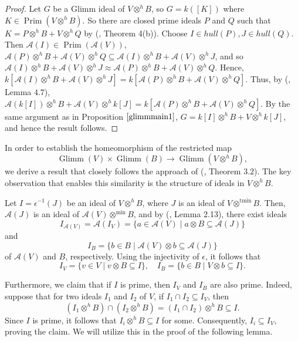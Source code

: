 \documentclass{birkjour}
\theoremstyle{definition}
\theoremstyle{remark}
\numberwithin{equation}{section}
\begin{document}
\begin{proof}
    Let $G$ be a Glimm ideal of $V \otimes^h B$, so $G= k([K])$ where $K\in \operatorname{Prim}(V\otimes^h B)$.  So there are closed prime ideals $P$ and $Q$ such that $K=P \otimes^h B+ V \otimes^h Q$ by (\cite{AA}, Theorem 4(b)). Choose $I\in hull(P), J\in hull(Q) $. Then 
    $ \mathcal{A}(I)\in \operatorname{Prim}( \mathcal{A}(V))$, $ \mathcal{A}(P) \otimes^h B+  \mathcal{A}(V) \otimes^h Q \subseteq  \mathcal{A}(I) \otimes^h B+  \mathcal{A}(V) \otimes^h J$, and so  $ \mathcal{A}(I) \otimes^h B+  \mathcal{A}(V) \otimes^h J \approx  \mathcal{A}(P) \otimes^h B+  \mathcal{A}(V) \otimes^h Q$. Hence, $ k[\mathcal{A}(I) \otimes^h B+  \mathcal{A}(V) \otimes^h J] = k[ \mathcal{A}(P) \otimes^h B+  \mathcal{A}(V) \otimes^h Q]$. Thus, by (\cite{AR}, Lemma $4.7$), $ \mathcal{A}(k[I]) \otimes^h B+  \mathcal{A}(V) \otimes^h k[J] = k[ \mathcal{A}(P) \otimes^h B+  \mathcal{A}(V) \otimes^h Q]$. By the same argument as in Proposition $\ref{glimmmain1}$,  $G=k[I] \otimes^h B+  V \otimes^h k[J]$, and hence the result follows.  
\end{proof}









In order to establish the homeomorphism of the restricted map 
\[
\operatorname{Glimm}(V) \times \operatorname{Glimm}(B) \to \operatorname{Glimm}(V \otimes^h B),
\]
we derive a result that closely follows the approach of (\cite{Lazer}, Theorem $3.2$). The key observation that enables this similarity is the structure of ideals in $V \otimes^h B$. 

Let \( I = \epsilon^{-1}(J) \) be an ideal of \( V \otimes^h B \), where \( J \) is an ideal of \( V \otimes^{\text{tmin}} B \). Then, \( \mathcal{A}(J) \) is an ideal of \( \mathcal{A}(V) \otimes^{\text{min}} B \), and by (\cite{EB}, Lemma 2.13), there exist ideals  
\[
I_{\mathcal{A}(V)} = \mathcal{A}(I_V) = \{ a \in \mathcal{A}(V) \mid a \otimes B \subseteq \mathcal{A}(J) \}
\]
and  
\[
I_B = \{ b \in B \mid \mathcal{A}(V) \otimes b \subseteq \mathcal{A}(J) \}
\]
of \( \mathcal{A}(V) \) and \( B \), respectively. Using the injectivity of \( \epsilon \), it follows that  
\[
I_V = \{ v \in V \mid v \otimes B \subseteq I \}, \quad
I_B = \{ b \in B \mid V \otimes b \subseteq I \}.
\]

Furthermore, we claim that if $I$ is prime, then $I_V$ and $I_B$  are also prime. Indeed, suppose that for two ideals $I_1$ and $I_2$ of $V$, if $I_1 \cap I_2 \subseteq I_V$, then $$(I_1 \otimes^h B) \cap (I_2 \otimes^h B)=(I_1 \cap I_2) \otimes^h B \subseteq I.$$ Since $I$ is prime, it follows that   $I_i \otimes^h B \subseteq I$ for some. Consequently, $I_i \subseteq I_V$, proving the claim. We will utilize this in the proof of the following lemma. 
\end{document}

